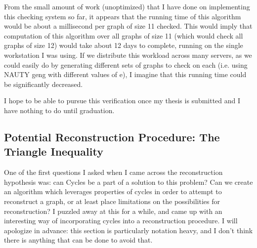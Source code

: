 From the small amount of work (unoptimized) that I have done on implementing this checking system so far, it appears that the running time of this algorithm would be about a millisecond per graph of size 11 checked.
This would imply that computation of this algorithm over all graphs of size 11 (which would check all graphs of size 12) would take about 12 days to complete, running on the single workstation I was using.
If we distribute this workload across many servers, as we could easily do by generating different sets of graphs to check on each (i.e. using NAUTY geng with different values of e), I imagine that this running time could be significantly decreased.

I hope to be able to pursue this verification once my thesis is submitted and I have nothing to do until graduation.

\subsection{Potential Reconstruction Procedure: The Triangle Inequality}

One of the first questions I asked when I came across the reconstruction hypothesis was: can Cycles be a part of a solution to this problem? Can we create an algorithm which leverages properties of cycles in order to attempt to reconstruct a graph, or at least place limitations on the possibilities for reconstruction? 
I puzzled away at this for a while, and came up with an interesting way of incorporating cycles into a reconstruction procedure.
I will apologize in advance: this section is particularly notation heavy, and I don't think there is anything that can be done to avoid that. 
